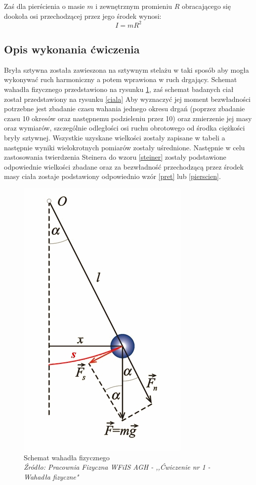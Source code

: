 \documentclass[a4paper,12pts]{article}
\begin{document}
	Zaś dla pierścienia o masie $m$ i zewnętrznym promieniu $R$ obracającego się dookoła osi przechodzącej przez jego środek wynosi:
	\begin{equation}
		I = mR^2
		\label{pierscien}
	\end{equation}


	\subsection{Opis wykonania ćwiczenia}
	Bryła sztywna została zawieszona na sztywnym stelażu w taki sposób aby mogła wykonywać ruch harmoniczny a potem wprawiona w ruch drgający. Schemat wahadła fizycznego przedstawiono na rysunku \ref{wahadlo}, zaś schemat badanych ciał został przedstawiony na rysunku \ref{ciala} Aby wyznaczyć jej moment bezwładności potrzebne jest zbadanie czasu wahania jednego okresu drgań (poprzez zbadanie czasu 10 okresów oraz następnemu podzieleniu przez 10) oraz zmierzenie jej masy oraz wymiarów, szczególnie odległości osi ruchu obrotowego od środka ciężkości bryły sztywnej. Wszystkie uzyskane wielkości zostały zapisane w tabeli a następnie wyniki wielokrotnych pomiarów zostały uśrednione. Następnie w celu zastosowania twierdzenia Steinera do wzoru \ref{steiner} zostały podstawione odpowiednie wielkości zbadane oraz za bezwładność przechodzącą przez środek masy ciała zostaje podstawiony odpowiednio wzór \ref{pret} lub \ref{pierscien}.
	
	\begin{figure}[!h]
		\centering
		\includegraphics[scale=0.5]{wahadlo.png}
		\caption{Schemat wahadła fizycznego \\ \textit{Źródło: Pracownia Fizyczna WFiIS AGH - ,,Ćwiczenie nr 1 - Wahadła fizyczne"}}
		\label{wahadlo}
	\end{figure}
\newpage
\end{document}
